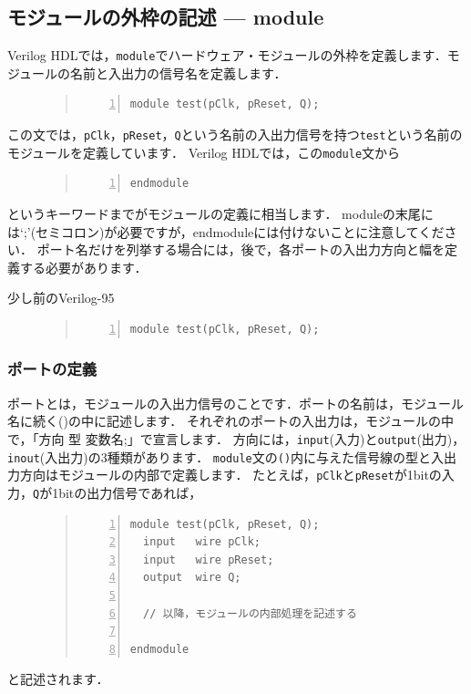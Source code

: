 \documentclass[a4paper,dvipdfmx]{jsarticle}
\begin{document}
\subsection{モジュールの外枠の記述 --- module}
Verilog HDLでは，\verb|module|でハードウェア・モジュールの外枠を定義します．モジュールの名前と入出力の信号名を定義します．
\begin{figure}[H]
\begin{quote}
\begin{Verbatim}[frame=single, numbers=left, baselinestretch=0.8]
module test(pClk, pReset, Q);
\end{Verbatim}
\end{quote}
\end{figure}
この文では，\verb|pClk|，\verb|pReset|，\verb|Q|という名前の入出力信号を持つ\verb|test|という名前のモジュールを定義しています．
Verilog HDLでは，この\verb|module|文から
\begin{figure}[H]
\begin{quote}
\begin{Verbatim}[frame=single, numbers=left, baselinestretch=0.8]
endmodule
\end{Verbatim}
\end{quote}
\end{figure}
というキーワードまでがモジュールの定義に相当します．
moduleの末尾には‘;’(セミコロン)が必要ですが，endmoduleには付けないことに注意してください．
ポート名だけを列挙する場合には，後で，各ポートの入出力方向と幅を定義する必要があります．

少し前のVerilog-95
\begin{figure}[H]
\begin{quote}
\begin{Verbatim}[frame=single, numbers=left, baselinestretch=0.8]
module test(pClk, pReset, Q);
\end{Verbatim}
\end{quote}
\end{figure}


\subsubsection{ポートの定義}
ポートとは，モジュールの入出力信号のことです．ポートの名前は，モジュール名に続く()の中に記述します．
それぞれのポートの入出力は，モジュールの中で，「方向 型 変数名;」で宣言します．
方向には，\verb|input|(入力)と\verb|output|(出力)，\verb|inout|(入出力)の3種類があります．
\verb|module|文の\verb|()|内に与えた信号線の型と入出力方向はモジュールの内部で定義します．
たとえば，\verb|pClk|と\verb|pReset|が1bitの入力，\verb|Q|が1bitの出力信号であれば，
\begin{figure}[H]
\begin{quote}
\begin{Verbatim}[frame=single, numbers=left, baselinestretch=0.8]
module test(pClk, pReset, Q);
  input   wire pClk;
  input   wire pReset;
  output  wire Q;

  // 以降，モジュールの内部処理を記述する

endmodule
\end{Verbatim}
\end{quote}
\end{figure}
と記述されます．
\end{document}

